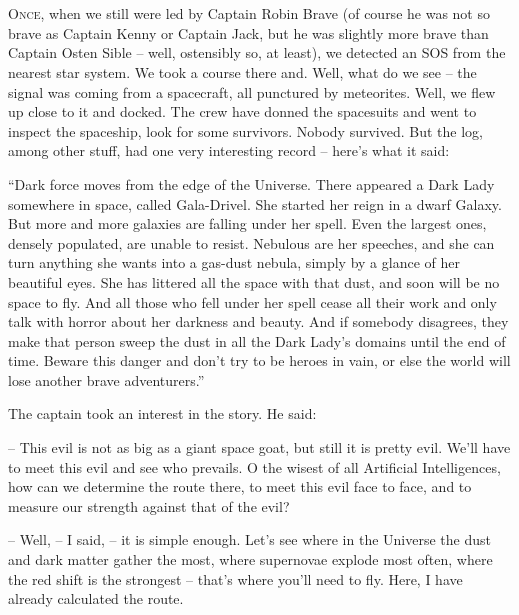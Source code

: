 \documentclass[ebook,twoside,final,openright]{memoir}
\begin{document}
\chapter{}
\par
\lettrine{O}{nce,} when we still were led by Captain Robin Brave (of course he was not so brave as Captain Kenny or Captain Jack, but he was slightly more brave than Captain Osten Sible – well, ostensibly so, at least), we detected an SOS from the nearest star system. We took a course there and. Well, what do we see – the signal was coming from a spacecraft, all punctured by meteorites. Well, we flew up close to it and docked. The crew have donned the spacesuits and went to inspect the spaceship, look for some survivors. Nobody survived. But the log, among other stuff, had one very interesting record – here’s what it said:\par
\par
“Dark force moves from the edge of the Universe. There appeared a Dark Lady somewhere in space, called Gala-Drivel. She started her reign in a dwarf Galaxy. But more and more galaxies are falling under her spell. Even the largest ones, densely populated, are unable to resist. Nebulous are her speeches, and she can turn anything she wants into a gas-dust nebula, simply by a glance of her beautiful eyes. She has littered all the space with that dust, and soon will be no space to fly. And all those who fell under her spell cease all their work and only talk with horror about her darkness and beauty. And if somebody disagrees, they make that person sweep the dust in all the Dark Lady’s domains until the end of time. Beware this danger and don’t try to be heroes in vain, or else the world will lose another brave adventurers.”\par
\par
The captain took an interest in the story. He said:\par
– This evil is not as big as a giant space goat, but still it is pretty evil. We'll have to meet this evil and see who prevails. O the wisest of all Artificial Intelligences, how can we determine the route there, to meet this evil face to face, and to measure our strength against that of the evil?\par
– Well, – I said, – it is simple enough. Let's see where in the Universe the dust and dark matter gather the most, where supernovae explode most often, where the red shift is the strongest – that’s where you’ll need to fly. Here, I have already calculated the route.\par
\end{document}
